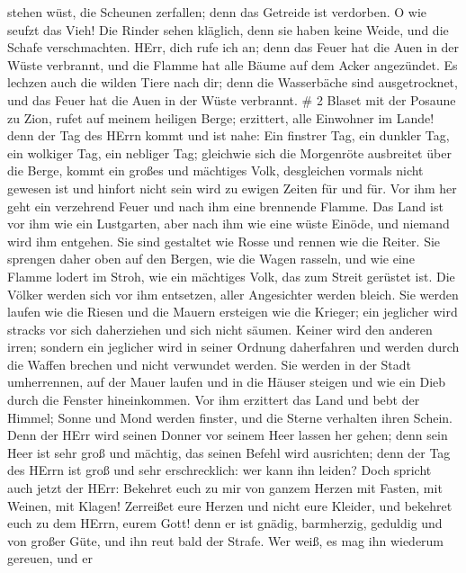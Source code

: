 stehen wüst, die Scheunen zerfallen; denn das Getreide ist verdorben.
 O wie seufzt das Vieh! Die Rinder sehen kläglich, denn sie
haben keine Weide, und die Schafe verschmachten.  HErr,
dich rufe ich an; denn das Feuer hat die Auen in der Wüste verbrannt,
und die Flamme hat alle Bäume auf dem Acker angezündet.  Es
lechzen auch die wilden Tiere nach dir; denn die Wasserbäche sind
ausgetrocknet, und das Feuer hat die Auen in der Wüste verbrannt. \# 2
 Blaset mit der Posaune zu Zion, rufet auf meinem heiligen
Berge; erzittert, alle Einwohner im Lande! denn der Tag des HErrn kommt
und ist nahe:  Ein finstrer Tag, ein dunkler Tag, ein
wolkiger Tag, ein nebliger Tag; gleichwie sich die Morgenröte ausbreitet
über die Berge, kommt ein großes und mächtiges Volk, desgleichen vormals
nicht gewesen ist und hinfort nicht sein wird zu ewigen Zeiten für und
für.  Vor ihm her geht ein verzehrend Feuer und nach ihm
eine brennende Flamme. Das Land ist vor ihm wie ein Lustgarten, aber
nach ihm wie eine wüste Einöde, und niemand wird ihm entgehen.
 Sie sind gestaltet wie Rosse und rennen wie die Reiter.
 Sie sprengen daher oben auf den Bergen, wie die Wagen
rasseln, und wie eine Flamme lodert im Stroh, wie ein mächtiges Volk,
das zum Streit gerüstet ist.  Die Völker werden sich vor ihm
entsetzen, aller Angesichter werden bleich.  Sie werden
laufen wie die Riesen und die Mauern ersteigen wie die Krieger; ein
jeglicher wird stracks vor sich daherziehen und sich nicht säumen.
 Keiner wird den anderen irren; sondern ein jeglicher wird
in seiner Ordnung daherfahren und werden durch die Waffen brechen und
nicht verwundet werden.  Sie werden in der Stadt
umherrennen, auf der Mauer laufen und in die Häuser steigen und wie ein
Dieb durch die Fenster hineinkommen.  Vor ihm erzittert das
Land und bebt der Himmel; Sonne und Mond werden finster, und die Sterne
verhalten ihren Schein.  Denn der HErr wird seinen Donner
vor seinem Heer lassen her gehen; denn sein Heer ist sehr groß und
mächtig, das seinen Befehl wird ausrichten; denn der Tag des HErrn ist
groß und sehr erschrecklich: wer kann ihn leiden?  Doch
spricht auch jetzt der HErr: Bekehret euch zu mir von ganzem Herzen mit
Fasten, mit Weinen, mit Klagen!  Zerreißet eure Herzen und
nicht eure Kleider, und bekehret euch zu dem HErrn, eurem Gott! denn er
ist gnädig, barmherzig, geduldig und von großer Güte, und ihn reut bald
der Strafe.  Wer weiß, es mag ihn wiederum gereuen, und er
